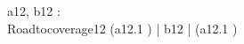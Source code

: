 \begin{circus}
\circchannel a12, b12 : \nat \\
\circprocess Roadtocoverage12 \circdef \circbegin
	\circspot
	    (a12.1 \then \Skip) \lpar {} | \lchanset b12 \rchanset | {}\rpar (a12.1 \then \Skip)
	    \\
	\circend
\end{circus}
